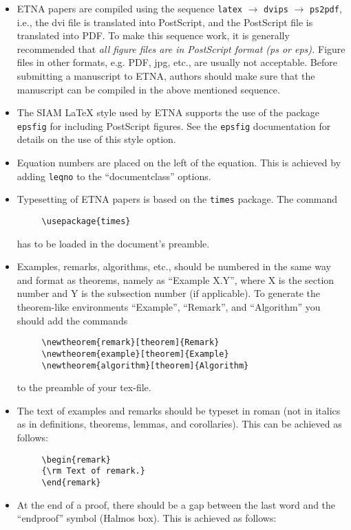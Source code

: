 \documentclass[10pt]{article}
\begin{document}
\begin{itemize}
\item ETNA papers are compiled using the sequence {\tt latex} $\rightarrow$
{\tt dvips} $\rightarrow$ {\tt ps2pdf}, i.e., the dvi file is
translated into PostScript, and the PostScript file is translated
into PDF. To make this sequence work, it is generally recommended
that {\em all figure files are in PostScript format (ps or eps).}
Figure files in other formats, e.g. PDF, jpg, etc., are usually not
acceptable. Before submitting a manuscript to ETNA, authors should
make sure that the manuscript can be compiled in the above mentioned
sequence.
%
\item The SIAM {\LaTeX} style used by ETNA supports the
use of the package {\tt epsfig} for including PostScript figures. See
the {\tt epsfig} documentation for details on the use of this style option.
%
\item Equation numbers are placed on the left of the equation. This is
achieved by adding {\tt leqno} to the ``documentclass'' options.
%
\item Typesetting of ETNA papers is based on the {\tt times} package.
The command
\begin{verbatim}     \usepackage{times}\end{verbatim}
has to be loaded in the document's preamble.
%
\item Examples, remarks, algorithms, etc., should be numbered in the
same way and format as theorems, namely as ``Example X.Y'', where X is the section
number and Y is the subsection number (if applicable). To generate the theorem-like
environments ``Example'', ``Remark'', and ``Algorithm'' you should add the commands
\begin{verbatim}
     \newtheorem{remark}[theorem]{Remark}
     \newtheorem{example}[theorem]{Example}
     \newtheorem{algorithm}[theorem]{Algorithm}
\end{verbatim}
to the preamble of your tex-file.
%
\item The text of examples and remarks should be typeset in roman
(not in italics as in definitions, theorems, lemmas, and corollaries).
This can be achieved as follows:
\begin{verbatim}
     \begin{remark}
     {\rm Text of remark.}
     \end{remark}
\end{verbatim}
%
\item  At the end of a proof, there should be a gap between the last
word and the ``endproof'' symbol (Halmos box). This is achieved as follows:

\end{itemize}
\end{document}
